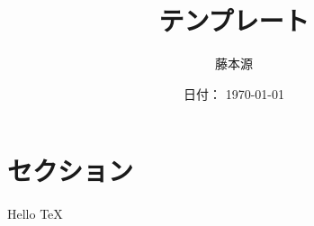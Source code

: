 \documentclass[lualatex, ja=standard]{bxjsarticle}
\title{テンプレート}
\author{藤本源}
\date{日付： \today}
\begin{document}
\maketitle

\section{セクション}

Hello \TeX
\end{document}
